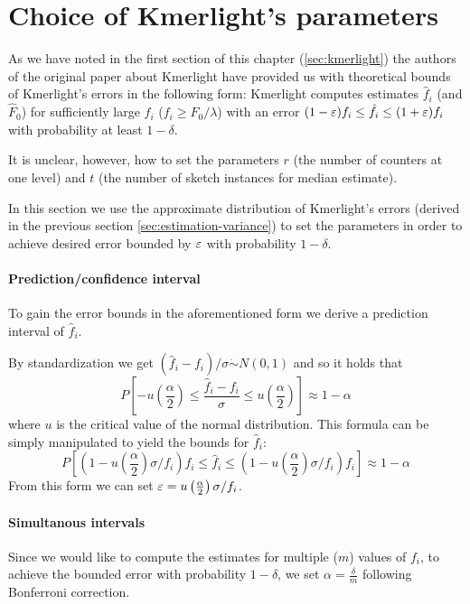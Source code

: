 \section{Choice of Kmerlight's parameters}
\label{sec:parameters-choice}

As we have noted in the first section of this chapter (\ref{sec:kmerlight})
the authors of the original paper about Kmerlight \cite{Sivadasan2016} have
provided us with theoretical bounds of Kmerlight's errors in the following form:
Kmerlight computes estimates $\hat f_i$ (and $\hat F_0$) for sufficiently large $f_i$ ($f_i \geq F_0 / \lambda$)
with an error $(1-\varepsilon)f_i \leq \hat f_i \leq (1+\varepsilon)f_i$ with probability at least $1 - \delta$.

It is unclear, however, how to set the parameters $r$ (the number of counters at one level) 
and $t$ (the number of sketch instances for median estimate).

In this section we use the approximate distribution of Kmerlight's errors (derived in the
previous section \ref{sec:estimation-variance}) to set the parameters in order to achieve
desired error bounded by $\varepsilon$ with probability $1-\delta$.

\paragraph{Prediction/confidence interval} To gain the error bounds
 in the
aforementioned form we derive a prediction interval of $\hat f_i$. 

By standardization we get $(\hat f_i - f_i)/\sigma \dot\sim N(0,1)$ and so it holds that
$$P\left[-u\left(\frac{\alpha}{2}\right) \leq \frac{\hat f_i - f_i}{\sigma} \leq u\left(\frac{\alpha}{2}\right) \right] \approx 1 - \alpha$$
where $u$ is the critical value of the normal distribution. This formula can be simply
manipulated to yield the bounds for $\hat f_i$:
$$P\left[\left(1-u\left(\frac{\alpha}{2}\right)\sigma/f_i\right) f_i \leq \hat f_i \leq \left(1-u\left(\frac{\alpha}{2}\right)\sigma/f_i\right) f_i \right] \approx 1 - \alpha$$
From this form we can set $\varepsilon = u\left(\frac{\alpha}{2}\right)\sigma/f_i$.

\paragraph{Simultanous intervals} Since we would like to compute the estimates
for multiple ($m$) values of $f_i$, to achieve the bounded error with probability
$1 - \delta$, we set $\alpha = \frac{\delta}{m}$ following Bonferroni correction.

